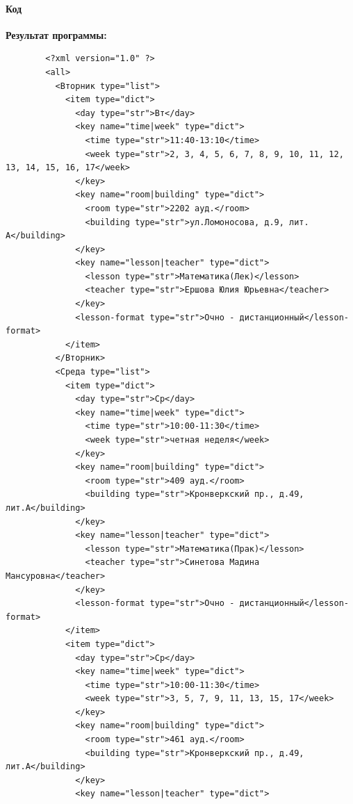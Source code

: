\documentclass[12pt,onecolumn]{article}
\begin{document}
\begin{flushleft}
\paragraph{Код}
\hfill \break
\FloatBarrier

\hfill \break
\textbf{Результат программы:}\\
\begingroup
    \fontsize{5pt}{7pt}\selectfont
    \begin{verbatim}  
        <?xml version="1.0" ?>
        <all>
          <Вторник type="list">
            <item type="dict">
              <day type="str">Вт</day>
              <key name="time|week" type="dict">
                <time type="str">11:40-13:10</time>
                <week type="str">2, 3, 4, 5, 6, 7, 8, 9, 10, 11, 12, 13, 14, 15, 16, 17</week>
              </key>
              <key name="room|building" type="dict">
                <room type="str">2202 ауд.</room>
                <building type="str">ул.Ломоносова, д.9, лит. А</building>
              </key>
              <key name="lesson|teacher" type="dict">
                <lesson type="str">Математика(Лек)</lesson>
                <teacher type="str">Ершова Юлия Юрьевна</teacher>
              </key>
              <lesson-format type="str">Очно - дистанционный</lesson-format>
            </item>
          </Вторник>
          <Среда type="list">
            <item type="dict">
              <day type="str">Ср</day>
              <key name="time|week" type="dict">
                <time type="str">10:00-11:30</time>
                <week type="str">четная неделя</week>
              </key>
              <key name="room|building" type="dict">
                <room type="str">409 ауд.</room>
                <building type="str">Кронверкский пр., д.49, лит.А</building>
              </key>
              <key name="lesson|teacher" type="dict">
                <lesson type="str">Математика(Прак)</lesson>
                <teacher type="str">Синетова Мадина Мансуровна</teacher>
              </key>
              <lesson-format type="str">Очно - дистанционный</lesson-format>
            </item>
            <item type="dict">
              <day type="str">Ср</day>
              <key name="time|week" type="dict">
                <time type="str">10:00-11:30</time>
                <week type="str">3, 5, 7, 9, 11, 13, 15, 17</week>
              </key>
              <key name="room|building" type="dict">
                <room type="str">461 ауд.</room>
                <building type="str">Кронверкский пр., д.49, лит.А</building>
              </key>
              <key name="lesson|teacher" type="dict">

\end{verbatim}
\end{flushleft}
\end{document}
